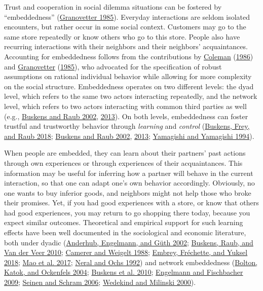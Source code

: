 \documentclass[
  11pt,
]{article}
\begin{document}
Trust and cooperation in social dilemma situations can be fostered by ``embeddedness'' (\protect\hyperlink{ref-granovetter_economic_1985}{Granovetter 1985}).
Everyday interactions are seldom isolated encounters, but rather occur in some social context.
Customers may go to the same store repeatedly or know others who go to this store.
People also have recurring interactions with their neighbors and their neighbors' acquaintances.
Accounting for embeddedness follows from the contributions by \protect\hyperlink{ref-coleman_structure_1986}{Coleman} (\protect\hyperlink{ref-coleman_structure_1986}{1986}) and \protect\hyperlink{ref-granovetter_economic_1985}{Granovetter} (\protect\hyperlink{ref-granovetter_economic_1985}{1985}), who advocated for the specification of robust assumptions on rational individual behavior while allowing for more complexity on the social structure.
Embeddedness operates on two different levels: the dyad level, which refers to the same two actors interacting repeatedly, and the network level, which refers to two actors interacting with common third parties as well (e.g., \protect\hyperlink{ref-buskens_raub_embedded_2002}{Buskens and Raub 2002}, \protect\hyperlink{ref-buskens_raub_handbook_2013}{2013}).
On both levels, embeddedness can foster trustful and trustworthy behavior through \emph{learning} and \emph{control} (\protect\hyperlink{ref-buskens2018trust}{Buskens, Frey, and Raub 2018}; \protect\hyperlink{ref-buskens_raub_embedded_2002}{Buskens and Raub 2002}, \protect\hyperlink{ref-buskens_raub_handbook_2013}{2013}; \protect\hyperlink{ref-yamagishi_yamagishi_trust_1994}{Yamagishi and Yamagishi 1994}).

When people are embedded, they can learn about their partners' past actions through own experiences or through experiences of their acquaintances.
This information may be useful for inferring how a partner will behave in the current interaction, so that one can adapt one's own behavior accordingly.
Obviously, no one wants to buy inferior goods, and neighbors might not help those who broke their promises.
Yet, if you had good experiences with a store, or know that others had good experiences, you may return to go shopping there today, because you expect similar outcomes.
Theoretical and empirical support for such learning effects have been well documented in the sociological and economic literature, both under dyadic (\protect\hyperlink{ref-anderhub_repeated_trust_2002}{Anderhub, Engelmann, and Güth 2002}; \protect\hyperlink{ref-buskens_raub_veer_triads_2010}{Buskens, Raub, and Van der Veer 2010}; \protect\hyperlink{ref-camerer_weigelt_sequential_1988}{Camerer and Weigelt 1988}; \protect\hyperlink{ref-embrey_etal_cooperation_2018}{Embrey, Fréchette, and Yuksel 2018}; \protect\hyperlink{ref-mao_resilient_cooperators_2017}{Mao et al. 2017}; \protect\hyperlink{ref-neral_ochs_sequential_1992}{Neral and Ochs 1992}) and network embeddedness (\protect\hyperlink{ref-bolton_electronic_2004}{Bolton, Katok, and Ockenfels 2004}; \protect\hyperlink{ref-buskens_raub_veer_triads_2010}{Buskens et al. 2010}; \protect\hyperlink{ref-engelmann_firschbacher_2009}{Engelmann and Fischbacher 2009}; \protect\hyperlink{ref-seinen_schram_social_2006}{Seinen and Schram 2006}; \protect\hyperlink{ref-wedekind_milinski_2000}{Wedekind and Milinski 2000}).
\end{document}
